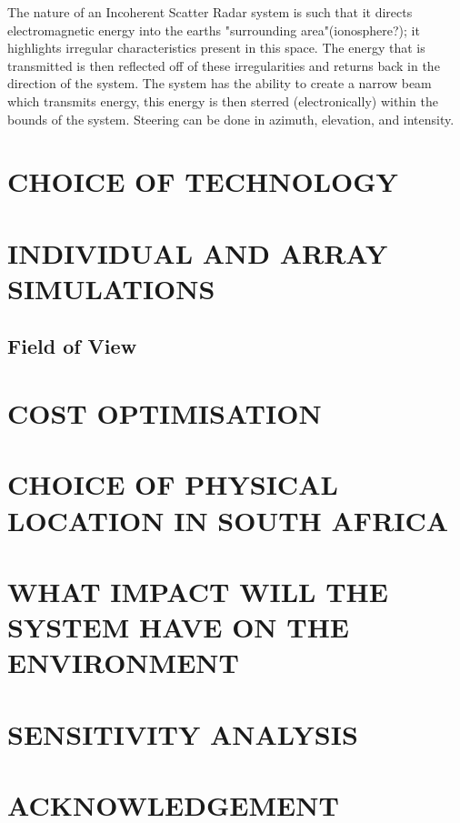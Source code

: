 \documentclass[11pt]{witseiepaper}
\begin{document}
The nature of an Incoherent Scatter Radar system is such that it directs electromagnetic energy into the earths "surrounding area"(ionosphere?); it highlights irregular characteristics present in this space. The energy that is transmitted is then reflected off of these irregularities and returns back in the direction of the system.
The system has the ability to create a narrow beam which transmits energy, this energy is then sterred (electronically) within the bounds of the system. Steering can be done in azimuth, elevation, and intensity. 
\section{CHOICE OF TECHNOLOGY}

\section{INDIVIDUAL AND ARRAY SIMULATIONS}


\subsection{Field of View} \label{sec:FieldOfView}

\section{COST OPTIMISATION}

\section{CHOICE OF PHYSICAL LOCATION IN SOUTH AFRICA}

\section{WHAT IMPACT WILL THE SYSTEM HAVE ON THE ENVIRONMENT}

\section{SENSITIVITY ANALYSIS}

\section*{ACKNOWLEDGEMENT} \label{sec:ACKNOWLEDGEMENT}


%




\end{document}
